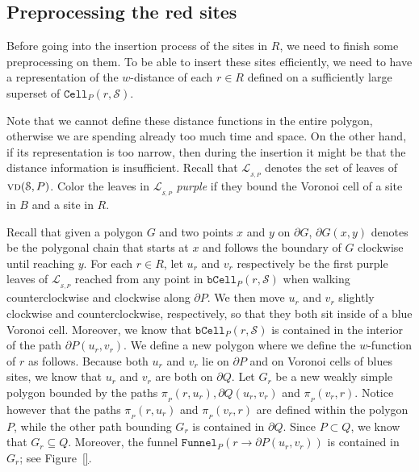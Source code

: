 \documentclass[a4paper,UKenglish]{socg-lipics-v2018}
\newcommand{\s}{\mathcal S}
\newcommand{\p}[3][P]{\ensuremath{\pi_{_{#1}}(#2, #3)}}
\newcommand{\funnel}[2][P]{\ensuremath{\mathtt{Funnel}_{\scriptscriptstyle #1}(#2)}}
\newcommand{\cell}[2][P]{\ensuremath{\mathtt{Cell}_{\scriptscriptstyle #1}(#2)}}
\newcommand{\bcell}[2][P]{\ensuremath{\mathtt{bCell}_{\scriptscriptstyle #1}(#2)}}
\newcommand{\vd}[2][P]{\textsc{vd}(#2, #1)}
\newcommand{\LL}[1][\s, P]{\ensuremath{\mathcal L_{_{#1}}}}
\begin{document}
\subsection{Preprocessing the red sites}\label{sec: Preprocessing of red sites}
Before going into the insertion process of the sites in $R$, we need to finish some preprocessing on them.
To be able to insert these sites efficiently, we need to have a representation of the $w$-distance of each $r\in R$ defined on a sufficiently large superset of $\cell{r, \s}$. 

Note that we cannot define these distance functions in the entire polygon, otherwise we are spending already too much time and space.
On the other hand, if its representation is too narrow, then during the insertion it might be that the distance information is insufficient.
Recall that $\LL$ denotes the set of leaves of $\vd{\s}$.
Color the leaves in $\LL$ \emph{purple} if they bound the Voronoi cell of a site in $B$ and a site in $R$. 




Recall that given a polygon $G$ and two points $x$ and $y$ on $\partial G$, $\partial G(x,y)$ denotes be the polygonal chain that starts at $x$ and follows the boundary of $G$ clockwise until reaching $y$.
For each $r\in R$, let $u_r$ and $v_r$ respectively be the first purple leaves of $\LL$ reached from any point in $\bcell{r, \s}$ when walking counterclockwise and clockwise along $\partial P$. 
We then move $u_r$ and $v_r$ slightly clockwise and counterclockwise, respectively, so that they both sit inside of a blue Voronoi cell. 
Moreover, we know that $\bcell{r,\s}$ is contained in the interior of the path $\partial P(u_r,v_r)$. 
We define a new polygon where we define the $w$-function of $r$ as follows.
Because both $u_r$ and $v_r$ lie on $\partial P$ and on Voronoi cells of blues sites, we know that $u_r$ and $v_r$ are both on $\partial Q$. 
Let $G_r$ be a new weakly simple polygon bounded by the paths $\p{r}{u_r}, \partial Q(u_r, v_r)$ and $\p{v_r}{r}$. 
Notice however that the paths $\p{r}{u_r}$ and $\p{v_r}{r}$ are defined within the polygon $P$, while the other path bounding $G_r$ is contained in $\partial Q$. 
Since $P\subset Q$, we know that $G_r\subseteq Q$. 
Moreover, the funnel $\funnel{r\to \partial P(u_r, v_r)}$ is contained in $G_r$; see Figure~\ref{}.
\end{document}
